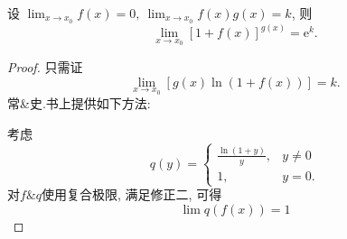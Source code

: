 \begin{proposition}
    设 $\lim_{x \to x_0} f \left( x \right) = 0,\ \lim_{x \to x_0} f \left( x \right) g \left( x \right) = k $, 则
    \begin{equation}
      \lim_{x \to x_0} \left[ 1 + f \left( x \right)  \right] ^{g \left( x \right) } = \mathrm{e}^{k}.
    \end{equation}
\end{proposition}
\begin{proof}
    只需证
    \begin{equation}
      \lim_{x \to x_0} \left[ g \left( x \right)  \ln \left( 1 + f \left( x \right)  \right)  \right] = k.
    \end{equation}
    常\&史.书上提供如下方法:

    考虑
    \begin{equation}
      q \left( y \right) = \begin{cases} 
        \frac{\ln \left( 1 + y \right) }{y}, & y \neq 0 
        \\ 
        1, & y = 0. 
      \end{cases}
    \end{equation}
    对$f \& q$使用复合极限, 满足修正二, 可得
    \begin{equation}
      \lim q \left( f \left( x \right)  \right) = 1
    \end{equation}
\end{proof}